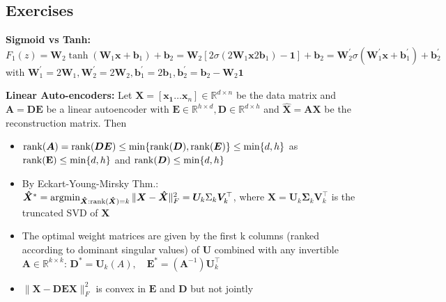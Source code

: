\subsection{Exercises}
\textbf{Sigmoid vs Tanh:} \(F_1(z)=\bm{W}_2 \tanh(\bm{W}_1 \bm{x} + \bm{b}_1)+\bm{b}_2=\bm{W}_2[2\sigma(2\bm{W}_1\bm{x} 2\bm{b}_1) - \bm{1}] + \bm{b}_2 = \bm{W}_2^\prime \sigma(\bm{W}_1^\prime \bm{x}+\bm{b}_1^\prime)+\bm{b}_2^\prime\) with \(\bm{W}_1^\prime = 2\bm{W}_1, \bm{W}_2^\prime=2\bm{W}_2, \bm{b}_1^\prime=2\bm{b}_1, \bm{b}_2^\prime = \bm{b}_2 - \bm{W}_2\bm{1}\)

\textbf{Linear Auto-encoders:} Let \(\bm{X}=[\bm{x_1}\ldots\bm{x}_n]\in\mathbb{R}^{d\times n}\) be the data matrix and \(\bm{A}=\bm{DE}\) be a linear autoencoder with \(\bm{E}\in\mathbb{R}^{h\times d}, \bm{D}\in \mathbb{R}^{d\times h}\) and \(\bm{\hat{X}}=\bm{AX}\) be the reconstruction matrix. Then
\begin{itemize}
    \item \(\operatorname{rank}(\bm{A})=\operatorname{rank}(\bm{DE})\leq \min\{\operatorname{rank}(\bm{D}), \operatorname{rank}(\bm{E})\}\leq \min\{d, h\}\) as \(\operatorname{rank}(\mathbf{E})\leq \min\{d, h\}\) and \(\operatorname{rank}(\bm{D})\leq \min\{d, h\}\)
    \item By Eckart-Young-Mirsky Thm.: \(\bm{\hat{X}}^*=\operatorname{argmin}_{\bm{\hat{X}}:\operatorname{rank}(\bm{\hat{X}})=k} \|\bm{X} - \bm{\hat{X}}\|_F^2 = \bm{U}_k \Sigma_k \bm{V}_k^\top\), where \(\bm{X}=\bm{U}_k\bm{\Sigma}_k \bm{V}_k^\top\) is the truncated SVD of \(\bm{X}\)
    \item The optimal weight matrices are given by the first k columns (ranked according to dominant singular values) of \(\bm{U}\) combined with any invertible \(\bm{A}\in\mathbb{R}^{k\times k}\): \(\bm{D}^*=\bm{U}_k(A),\quad \bm{E}^*=(\bm{A}^{-1})\bm{U}_k^\top\)
    \item \(\|\bm{X}-\bm{DEX}\|_F^2\) is convex in \(\bm{E}\) and \(\bm{D}\) but not jointly
\end{itemize}

